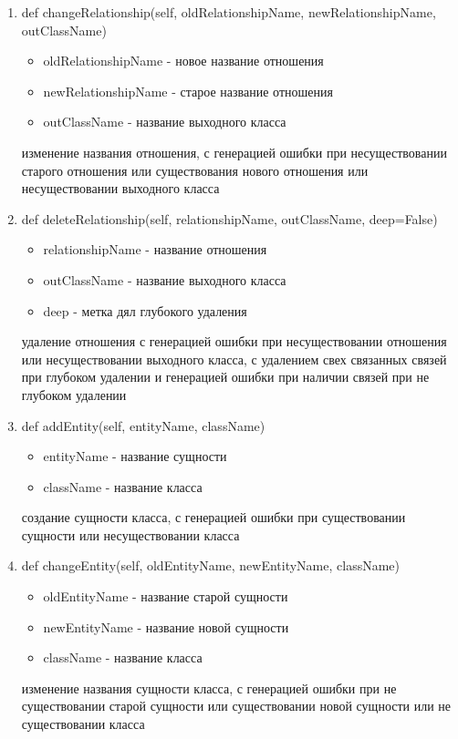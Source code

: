 \documentclass{article}
\begin{document}
\begin{enumerate}
	\item def changeRelationship(self, oldRelationshipName, newRelationshipName, outClassName)
	\begin{itemize}
		\item oldRelationshipName - новое название отношения
		\item newRelationshipName - старое название отношения
		\item outClassName - название выходного класса
	\end{itemize}
	изменение названия отношения, с генерацией ошибки при несуществовании старого отношения или существования нового отношения или несуществовании выходного класса
	
	\item def deleteRelationship(self, relationshipName, outClassName, deep=False)
	\begin{itemize}
		\item relationshipName - название отношения
		\item outClassName - название выходного класса
		\item deep - метка дял глубокого удаления
	\end{itemize}
	удаление отношения с генерацией ошибки при несуществовании отношения или несуществовании выходного класса, с удалением свех связанных связей при глубоком удалении и генерацией ошибки при наличии связей при не глубоком удалении
	
	\item def addEntity(self, entityName, className)
	\begin{itemize}
		\item entityName - название сущности
		\item className - название класса
	\end{itemize}
	создание сущности класса, с генерацией ошибки при существовании сущности или несуществовании класса
	
	\item def changeEntity(self, oldEntityName, newEntityName, className)
	\begin{itemize}
		\item oldEntityName - название старой сущности
		\item newEntityName - название новой сущности
		\item className - название класса
	\end{itemize}
	изменение названия сущности класса, с генерацией ошибки при не существовании старой сущности или существовании новой сущности или не существовании класса
	

\end{enumerate}
\end{document}
